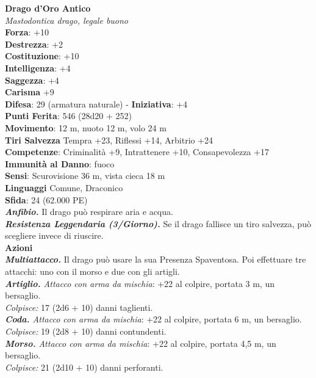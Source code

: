 \begin{multicols}{2}
\medskip\textbf{Drago d'Oro Antico}\\
\emph{Mastodontica drago, legale buono}\\
\textbf{Forza}: +10\\
\textbf{Destrezza}: +2\\
\textbf{Costituzione}: +10\\
\textbf{Intelligenza}: +4\\
\textbf{Saggezza}: +4\\
\textbf{Carisma} +9\\
\textbf{Difesa}: 29 (armatura naturale) - \textbf{Iniziativa}: +4\\
\textbf{Punti Ferita}: 546 (28d20 + 252) \\
\textbf{Movimento}: 12 m, nuoto 12 m, volo 24 m\\
\textbf{Tiri Salvezza} Tempra +23, Riflessi +14, Arbitrio +24\\
\textbf{Competenze}: Criminalità +9, Intrattenere +10, Consapevolezza +17\\
\textbf{Immunità al Danno}: fuoco\\
\textbf{Sensi}: Scurovisione 36 m, vista cieca 18 m\\
\textbf{Linguaggi} Comune, Draconico\\
\textbf{Sfida}: 24 (62.000 PE)\smallskip\\
\emph{\textbf{Anfibio.}} Il drago può respirare aria e acqua.\\
\emph{\textbf{Resistenza Leggendaria (3/Giorno).}} Se il drago fallisce un tiro salvezza, può scegliere invece di riuscire.\\
\smallskip\textbf{Azioni}\\
\emph{\textbf{Multiattacco.}} Il drago può usare la sua Presenza Spaventosa. Poi effettuare tre attacchi: uno con il morso e due con gli artigli.\\
\emph{\textbf{Artiglio.} Attacco con arma da mischia}: +22 al colpire, portata 3 m, un bersaglio.\\
\emph{Colpisce:} 17 (2d6 + 10) danni taglienti.\\
\emph{\textbf{Coda.} Attacco con arma da mischia}: +22 al colpire, portata 6 m, un bersaglio.\\
\emph{Colpisce:} 19 (2d8 + 10) danni contundenti.\\
\emph{\textbf{Morso.} Attacco con arma da mischia}: +22 al colpire, portata 4,5 m, un bersaglio.\\
\emph{Colpisce:} 21 (2d10 + 10) danni perforanti.\\

\end{multicols}
